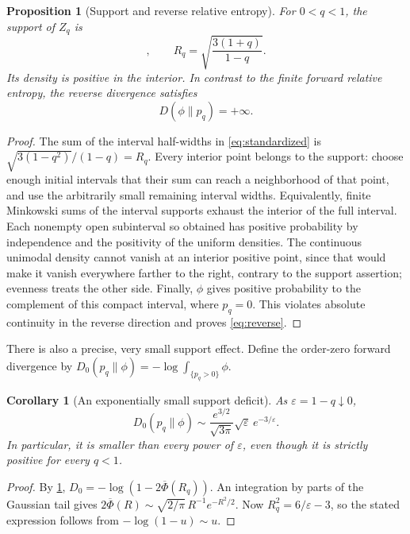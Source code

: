 \documentclass[11pt,a4paper]{article}
\numberwithin{equation}{section}
\newtheorem{proposition}[theorem]{Proposition}
\newtheorem{corollary}[theorem]{Corollary}
\theoremstyle{definition}
\theoremstyle{remark}
\newcommand{\eps}{\varepsilon}
\begin{document}
\begin{proposition}[Support and reverse relative entropy]
\label{prop:reverse}
For $0<q<1$, the support of $Z_q$ is
\begin{equation}
 [-R_q,R_q],\qquad
 R_q=\sqrt{\frac{3(1+q)}{1-q}}.
 \label{eq:support}
\end{equation}
Its density is positive in the interior. In contrast to the finite forward
relative entropy, the reverse divergence satisfies
\begin{equation}
 D(\phi\|p_q)=+\infty.
 \label{eq:reverse}
\end{equation}
\end{proposition}
\begin{proof}
The sum of the interval half-widths in \eqref{eq:standardized} is
$\sqrt{3(1-q^2)}/(1-q)=R_q$. Every interior point belongs to the support:
choose enough initial intervals that their sum can reach a neighborhood of
that point, and use the arbitrarily small remaining interval widths. Equivalently,
finite Minkowski sums of the interval supports exhaust the interior of the full
interval. Each nonempty open subinterval so obtained has positive probability
by independence and the positivity of the uniform densities. The continuous
unimodal density cannot vanish at an interior positive point, since that would
make it vanish everywhere farther to the right, contrary to the support
assertion; evenness treats the other side. Finally, $\phi$ gives positive
probability to the complement of this compact interval, where $p_q=0$.
This violates absolute continuity in the reverse direction and proves
\eqref{eq:reverse}.
\end{proof}

There is also a precise, very small support effect. Define the order-zero
forward divergence by
$D_0(p_q\|\phi)=-\log\int_{\{p_q>0\}}\phi$.

\begin{corollary}[An exponentially small support deficit]
\label{cor:zero-order}
As $\eps=1-q\downarrow0$,
\begin{equation}
 D_0(p_q\|\phi)
 \sim\frac{e^{3/2}}{\sqrt{3\pi}}\sqrt\eps\,e^{-3/\eps}.
 \label{eq:zero-order}
\end{equation}
In particular, it is smaller than every power of $\eps$, even though it is
strictly positive for every $q<1$.
\end{corollary}
\begin{proof}
By \cref{prop:reverse},
$D_0=-\log(1-2\overline\Phi(R_q))$.
An integration by parts of the Gaussian tail gives
$2\overline\Phi(R)\sim\sqrt{2/\pi}\,R^{-1}e^{-R^2/2}$.
Now $R_q^2=6/\eps-3$, so the stated expression follows from
$-\log(1-u)\sim u$.
\end{proof}
\end{document}
